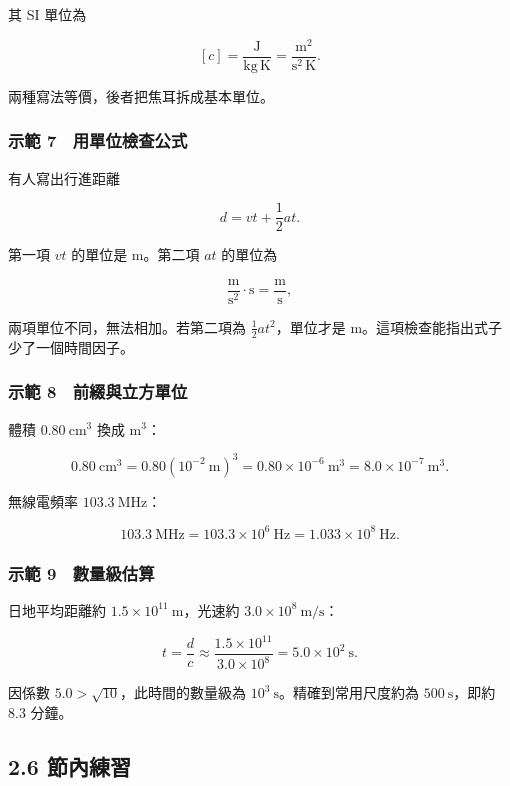 \documentclass[11pt,a4paper]{article}
\begin{document}
其 SI 單位為

\[
[c]=\frac{\mathrm J}{\mathrm{kg\,K}}
=\frac{\mathrm{m^2}}{\mathrm{s^2\,K}}.
\]

兩種寫法等價，後者把焦耳拆成基本單位。

\subsubsection{示範 7　用單位檢查公式}\label{ux793aux7bc4-7-ux7528ux55aeux4f4dux6aa2ux67e5ux516cux5f0f}

有人寫出行進距離

\[
d=vt+\frac12at.
\]

第一項 \(vt\) 的單位是 m。第二項 \(at\) 的單位為

\[
\frac{\mathrm m}{\mathrm{s^2}}\cdot\mathrm s
=\frac{\mathrm m}{\mathrm s},
\]

兩項單位不同，無法相加。若第二項為 \(\frac12at^2\)，單位才是 m。這項檢查能指出式子少了一個時間因子。

\subsubsection{示範 8　前綴與立方單位}\label{ux793aux7bc4-8-ux524dux7db4ux8207ux7acbux65b9ux55aeux4f4d}

體積 \(0.80\ \mathrm{cm^3}\) 換成 \(\mathrm{m^3}\)：

\[
0.80\ \mathrm{cm^3}
=0.80(10^{-2}\ \mathrm m)^3
=0.80\times10^{-6}\ \mathrm{m^3}
=8.0\times10^{-7}\ \mathrm{m^3}.
\]

無線電頻率 \(103.3\ \mathrm{MHz}\)：

\[
103.3\ \mathrm{MHz}
=103.3\times10^6\ \mathrm{Hz}
=1.033\times10^8\ \mathrm{Hz}.
\]

\subsubsection{示範 9　數量級估算}\label{ux793aux7bc4-9-ux6578ux91cfux7d1aux4f30ux7b97}

日地平均距離約 \(1.5\times10^{11}\ \mathrm m\)，光速約 \(3.0\times10^8\ \mathrm{m/s}\)：

\[
t=\frac dc
\approx\frac{1.5\times10^{11}}{3.0\times10^8}
=5.0\times10^2\ \mathrm s.
\]

因係數 \(5.0>\sqrt{10}\)，此時間的數量級為 \(10^3\ \mathrm s\)。精確到常用尺度約為 \(500\ \mathrm s\)，即約 \(8.3\) 分鐘。

\subsection{2.6 節內練習}\label{ux7bc0ux5167ux7df4ux7fd2-1}
\end{document}

